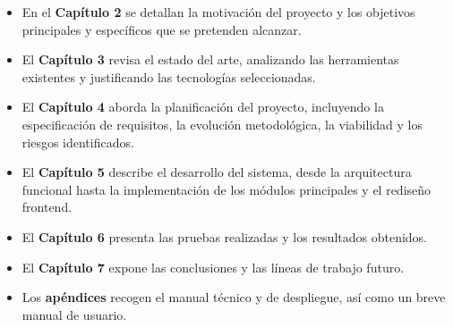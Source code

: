 \begin{itemize}
    \item En el \textbf{Capítulo 2} se detallan la motivación del proyecto y los objetivos principales y específicos que se pretenden alcanzar.
    \item El \textbf{Capítulo 3} revisa el estado del arte, analizando las herramientas existentes y justificando las tecnologías seleccionadas.
    \item El \textbf{Capítulo 4} aborda la planificación del proyecto, incluyendo la especificación de requisitos, la evolución metodológica, la viabilidad y los riesgos identificados.
    \item El \textbf{Capítulo 5} describe el desarrollo del sistema, desde la arquitectura funcional hasta la implementación de los módulos principales y el rediseño frontend.
    \item El \textbf{Capítulo 6} presenta las pruebas realizadas y los resultados obtenidos.
    \item El \textbf{Capítulo 7} expone las conclusiones y las líneas de trabajo futuro.
    \item Los \textbf{apéndices} recogen el manual técnico y de despliegue, así como un breve manual de usuario.
\end{itemize}